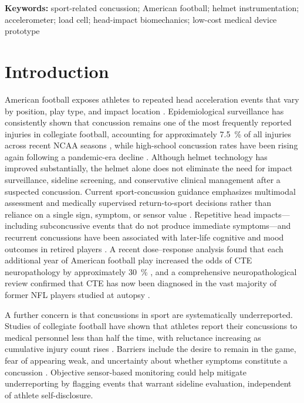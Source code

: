 \documentclass[11pt]{article}
\begin{document}
\noindent\textbf{Keywords:} sport-related concussion; American football; helmet instrumentation; accelerometer; load cell; head-impact biomechanics; low-cost medical device prototype

\section{Introduction}
American football exposes athletes to repeated head acceleration events that vary by position, play type, and impact location \citep{crisco2010frequency,clark2024position}. Epidemiological surveillance has consistently shown that concussion remains one of the most frequently reported injuries in collegiate football, accounting for approximately \SI{7.5}{\percent} of all injuries across recent NCAA seasons \citep{kerr2021ncaafootball}, while high-school concussion rates have been rising again following a pandemic-era decline \citep{kieffer2024epidemiology}. Although helmet technology has improved substantially, the helmet alone does not eliminate the need for impact surveillance, sideline screening, and conservative clinical management after a suspected concussion. Current sport-concussion guidance emphasizes multimodal assessment and medically supervised return-to-sport decisions rather than reliance on a single sign, symptom, or sensor value \citep{patricios2023consensus,echemendia2023scat6}. Repetitive head impacts---including subconcussive events that do not produce immediate symptoms---and recurrent concussions have been associated with later-life cognitive and mood outcomes in retired players \citep{guskiewicz2005recurrent,guskiewicz2007depression,mez2017cte,tierney2022subconcussive}. A recent dose--response analysis found that each additional year of American football play increased the odds of CTE neuropathology by approximately \SI{30}{\percent} \citep{alosco2023duration}, and a comprehensive neuropathological review confirmed that CTE has now been diagnosed in the vast majority of former NFL players studied at autopsy \citep{mckee2023neuropathology}.

A further concern is that concussions in sport are systematically underreported. Studies of collegiate football have shown that athletes report their concussions to medical personnel less than half the time, with reluctance increasing as cumulative injury count rises \citep{kerr2019concussion}. Barriers include the desire to remain in the game, fear of appearing weak, and uncertainty about whether symptoms constitute a concussion \citep{registermihalik2013understanding}. Objective sensor-based monitoring could help mitigate underreporting by flagging events that warrant sideline evaluation, independent of athlete self-disclosure.
\end{document}
